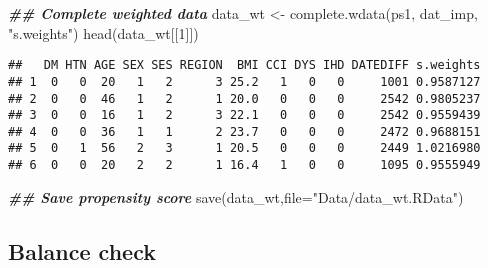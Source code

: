 \documentclass[
]{book}
\newenvironment{Shaded}{\begin{snugshade}}{\end{snugshade}}
\newcommand{\AttributeTok}[1]{\textcolor[rgb]{0.77,0.63,0.00}{#1}}
\newcommand{\DecValTok}[1]{\textcolor[rgb]{0.00,0.00,0.81}{#1}}
\newcommand{\DocumentationTok}[1]{\textcolor[rgb]{0.56,0.35,0.01}{\textbf{\textit{#1}}}}
\newcommand{\FunctionTok}[1]{\textcolor[rgb]{0.00,0.00,0.00}{#1}}
\newcommand{\NormalTok}[1]{#1}
\newcommand{\OtherTok}[1]{\textcolor[rgb]{0.56,0.35,0.01}{#1}}
\newcommand{\StringTok}[1]{\textcolor[rgb]{0.31,0.60,0.02}{#1}}
\begin{document}
\begin{Shaded}
\begin{Highlighting}[]
\DocumentationTok{\#\# Complete weighted data}
\NormalTok{data\_wt }\OtherTok{\textless{}{-}} \FunctionTok{complete.wdata}\NormalTok{(ps1, dat\_imp, }\StringTok{"s.weights"}\NormalTok{)}
\FunctionTok{head}\NormalTok{(data\_wt[[}\DecValTok{1}\NormalTok{]])}
\end{Highlighting}
\end{Shaded}

\begin{verbatim}
##   DM HTN AGE SEX SES REGION  BMI CCI DYS IHD DATEDIFF s.weights
## 1  0   0  20   1   2      3 25.2   1   0   0     1001 0.9587127
## 2  0   0  46   1   2      1 20.0   0   0   0     2542 0.9805237
## 3  0   0  16   1   2      3 22.1   0   0   0     2542 0.9559439
## 4  0   0  36   1   1      2 23.7   0   0   0     2472 0.9688151
## 5  0   1  56   2   3      1 20.5   0   0   0     2449 1.0216980
## 6  0   0  20   2   2      1 16.4   1   0   0     1095 0.9555949
\end{verbatim}

\begin{Shaded}
\begin{Highlighting}[]
\DocumentationTok{\#\# Save propensity score}
\FunctionTok{save}\NormalTok{(data\_wt,}\AttributeTok{file=}\StringTok{"Data/data\_wt.RData"}\NormalTok{)}
\end{Highlighting}
\end{Shaded}

\hypertarget{balance-check-3}{%
\subsection{Balance check}\label{balance-check-3}}
\end{document}
